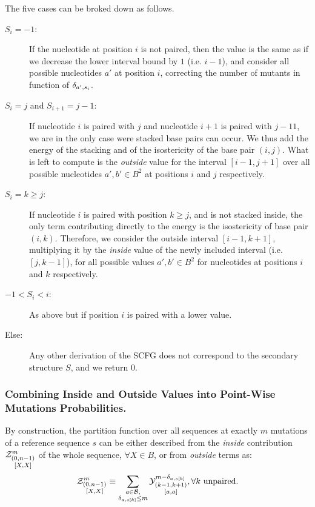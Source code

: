 The five cases can be broked down as follows.
\begin{description}
\item[$S_i=-1$:] If the nucleotide at position $i$ is not paired, then the value is the same
as if we decrease the lower interval bound by $1$ (i.e. $i-1$), and consider all possible
nucleotides $a'$ at position $i$, correcting the number of mutants
in function of $\delta_{a',s_i}$.
\item[$S_{i}=j$ and $S_{i+1}=j-1$:] If nucleotide $i$ is paired with $j$ and nucleotide $i+1$ is
paired with $j-11$, we are in the only case were stacked base pairs can occur. We thus add
the energy of the stacking and of the isostericity of the base pair $(i,j)$. What is left
to compute is the \emph{outside} value for the interval $[i-1,j+1]$ over all possible nucleotides 
$a',b'\in B^2$ at positions $i$ and $j$ respectively.
\item[$S_{i}=k \geq j$:]If nucleotide $i$ is paired with position $k\geq j$, 
and is not stacked inside, the 
only term contributing directly to the energy is the isostericity of base pair $(i,k)$. 
Therefore, we consider the outside interval $[i-1,k+1]$, multiplying it by the \emph{inside}
value of the newly included interval (i.e. $[j,k-1]$), for 
all possible values $a',b'\in B^2$ for nucleotides at positions $i$ and $k$ respectively.
\item[$-1<S_{i}<i$:]As above but if position $i$ is paired with a lower value.
\item[Else:] Any other derivation of the SCFG does not correspond to the 
secondary structure $S$, and we return $0$.


\end{description}

\subsubsection{Combining Inside and Outside Values into Point-Wise Mutations Probabilities.}
By construction, the partition function over all sequences at exactly $m$ mutations of a reference sequence $s$ can 
be either described from the \emph{inside} contribution $\Z{0,n-1}{m}{X,X}$ of the whole sequence,
$\forall X\in B$, or from \emph{outside} terms as:
$$
	\Z{0,n-1}{m}{X,X}
	\equiv
	\sum_{\substack{a\in \B,\\ \Kron_{a,s[k]}\le m}}	
	\Y{k-1,k+1}{m-\Kron_{a,s[k]}}{a,a},\forall k \text{	unpaired.}
$$

